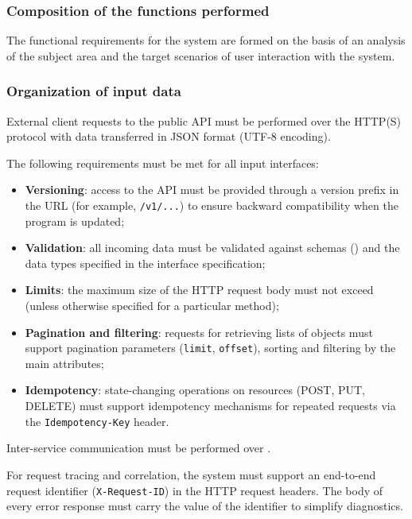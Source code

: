 \documentclass[12pt,a4paper]{extarticle}
\begin{document}
\subsubsection{Composition of the functions performed}



\clearpage

The functional requirements for the system are formed on the basis of an analysis of the subject area and the target scenarios of user interaction with the system.

\subsubsection{Organization of input data}
\label{sec:input_data}

\begin{hseExample}
External client requests to the public API must be performed over the HTTP(S) protocol with data transferred in JSON format (UTF-8 encoding).

The following requirements must be met for all input interfaces:
\begin{itemize}[nosep, leftmargin=1.25cm]
    \item \textbf{Versioning}: access to the API must be provided through a version prefix in the URL (for example, \texttt{/v1/...}) to ensure backward compatibility when the program is updated;
    \item \textbf{Validation}: all incoming data must be validated against schemas () and the data types specified in the interface specification;
    \item \textbf{Limits}: the maximum size of the HTTP request body must not exceed  (unless otherwise specified for a particular method);
    \item \textbf{Pagination and filtering}: requests for retrieving lists of objects must support pagination parameters (\texttt{limit}, \texttt{offset}), sorting and filtering by the main attributes;
    \item \textbf{Idempotency}: state-changing operations on resources (POST, PUT, DELETE) must support idempotency mechanisms for repeated requests via the \texttt{Idempotency-Key} header.
\end{itemize}

Inter-service communication must be performed over .

For request tracing and correlation, the system must support an end-to-end request identifier (\texttt{X-Request-ID}) in the HTTP request headers. The body of every error response must carry the value of the identifier to simplify diagnostics.
\end{hseExample}
\end{document}
